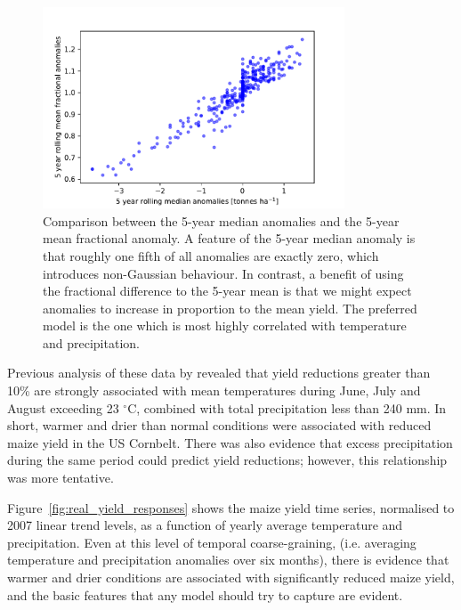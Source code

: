 \documentclass[12pt]{article}
\begin{document}
\begin{figure}
\centering
\includegraphics[width=0.8\textwidth]{./figures/median_vs_frac_anoms_noline}
\caption{\label{fig:median_vs_frac_anoms_noline} Comparison between the 5-year median anomalies and the 5-year mean fractional anomaly. A feature of the 5-year median anomaly is that roughly one fifth of all anomalies are exactly zero, which introduces non-Gaussian behaviour. In contrast, a benefit of using the fractional difference to the 5-year mean is that we might expect anomalies to increase in proportion to the mean yield. The preferred model is the one which is most highly correlated with temperature and precipitation.
}
\end{figure}

Previous analysis of these data by \cite{kent:2017} revealed that yield reductions greater than 10\% are strongly associated with mean temperatures during June, July and August exceeding 23 $^\circ$C, combined with total precipitation less than 240 mm. In short, warmer and drier than normal conditions were associated with reduced maize yield in the US Cornbelt. There was also evidence that excess precipitation during the same period could predict yield reductions; however, this relationship was more tentative.

Figure~\ref{fig:real_yield_responses} shows the maize yield time series, normalised to 2007 linear trend levels, as a function of yearly average temperature and precipitation. 
Even at this level of temporal coarse-graining, (i.e. averaging temperature and precipitation anomalies over six months), there is evidence that warmer and drier conditions are associated with significantly reduced maize yield, and the basic features that any model should try to capture are evident. 
\end{document}
